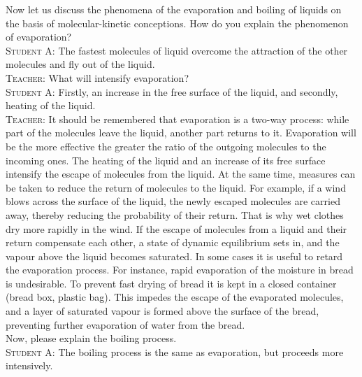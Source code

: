 \documentclass[a4paper,sfsidenotes]{tufte-book}
\begin{document}
Now let us discuss the phenomena of the evaporation and boiling of liquids on the basis of molecular-kinetic conceptions. How do you explain the phenomenon of evaporation?
\\
\textsc{Student A:} The fastest molecules of liquid overcome the attraction of the other molecules and fly out of the liquid.
\\
\textsc{Teacher:} What will intensify evaporation?
\\
\textsc{Student A:} Firstly, an increase in the free surface of the liquid, and secondly, heating of the liquid.
\\
\textsc{Teacher:} It should be remembered that evaporation is a two-way process: while part of the molecules leave the liquid, another part returns to it. Evaporation will be the more effective the greater the ratio of the outgoing molecules to the incoming ones. The heating of the liquid and an increase of its free surface intensify the escape of molecules from the liquid. At the same time, measures can be taken to reduce the return of molecules to the liquid. For example, if a wind blows across the surface of the liquid, the newly escaped molecules are carried away, thereby reducing the probability of their return. That is why wet clothes dry more rapidly in the wind. If the escape of molecules from a liquid and their return compensate each other, a state of dynamic equilibrium sets in, and the vapour above the liquid becomes saturated. In some cases it is useful to retard the evaporation process. For instance, rapid evaporation of the moisture in bread is undesirable. To prevent fast drying of bread it is kept in a closed container (bread box, plastic bag). This impedes the escape of the evaporated molecules, and a layer of saturated vapour is formed above the surface of the bread, preventing further evaporation of water from the bread.
\\
Now, please explain the boiling process.
\\
\textsc{Student A:} The boiling process is the same as evaporation, but proceeds more intensively.
\\
\end{document}
